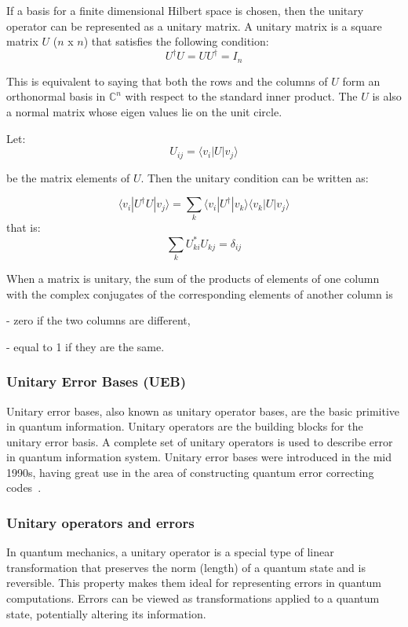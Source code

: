 If a basis for a finite dimensional Hilbert space is chosen, then the unitary operator can be represented as a unitary matrix. A unitary matrix is a square matrix $U$ ($n$ x $n$) that satisfies the following condition:
\begin{equation}
  U^{\dagger}U = UU^{\dagger} = I_{n}
\end{equation}

This is equivalent to saying that both the rows and the columns of $U$ form an orthonormal basis in $\mathbb{C}^n$ with respect to the standard inner product. The $U$ is also a normal matrix whose eigen values lie on the unit circle.

Let: $$ U_{ij} = \langle v_{i} | U | v_{j} \rangle $$

be the matrix elements of $U$. Then the unitary condition can be written as:

$$ \langle v_{i} | U^{\dagger}U | v_{j} \rangle = \sum_{k} \langle v_{i} | U^{\dagger} | v_{k} \rangle \langle v_{k} | U | v_{j} \rangle $$
that is:
$$ \sum_{k} U_{ki}^{*}U_{kj} = \delta_{ij} $$

When a matrix is unitary, the sum of the products of elements of one column with the complex conjugates of the corresponding elements of another column is

- zero if the two columns are different, 

- equal to 1 if they are the same.

\subsubsection{Unitary Error Bases (UEB)}

Unitary error bases, also known as unitary operator bases, are the basic primitive in quantum information. Unitary operators are the building blocks for the unitary error basis. A complete set of unitary operators is used to describe error in quantum information system. 
Unitary error bases were introduced in the mid 1990s, having great use in the area of constructing quantum error correcting codes~\cite{knill1996NonBinaryUnitary, knill1996GroupRepresentationsError}. 

\subsubsection{Unitary operators and errors}

In quantum mechanics, a unitary operator is a special type of linear transformation that preserves the norm (length) of a quantum state and is reversible. This property makes them ideal for representing errors in quantum computations. Errors can be viewed as transformations applied to a quantum state, potentially altering its information.

